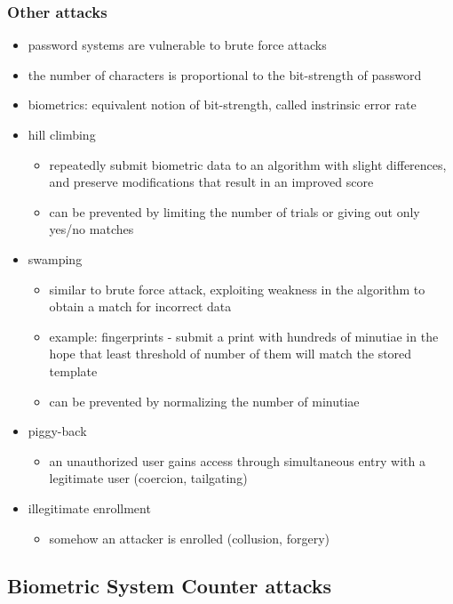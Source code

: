 \documentclass[paper=a4, fontsize=11pt]{scrartcl} %
\numberwithin{equation}{section} %
\numberwithin{figure}{section} %
\numberwithin{table}{section} %
\begin{document}
\subsubsection{Other attacks}

\begin{itemize}
\item password systems are vulnerable to brute force attacks
\item the number of characters is proportional to the bit-strength of password
\item biometrics: equivalent notion of bit-strength, called instrinsic error rate
\item hill climbing
\begin{itemize}
\item repeatedly submit biometric data to an algorithm with slight differences, and preserve modifications that result in an improved score
\item can be prevented by limiting the number of trials or giving out only yes/no matches
\end{itemize}
\item swamping
\begin{itemize}
\item similar to brute force attack, exploiting weakness in the algorithm to obtain a match for incorrect data
\item example: fingerprints - submit a print with hundreds of minutiae in the hope that least threshold of number of them will match the stored template
\item can be prevented by normalizing the number of minutiae
\end{itemize}
\item piggy-back
\begin{itemize}
\item an unauthorized user gains access through simultaneous entry with a legitimate user (coercion, tailgating)
\end{itemize}
\item illegitimate enrollment
\begin{itemize}
\item somehow an attacker is enrolled (collusion, forgery)
\end{itemize}
\end{itemize}

\subsection{Biometric System Counter attacks}
\end{document}
